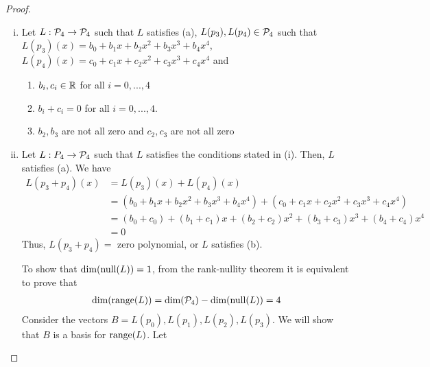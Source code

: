 \begin{proof}
    \renewcommand{\qedsymbol}{$\blacksquare$}
    \begin{enumerate}[(i)]
        \item Let $L:\P_4\rightarrow\P_4$ such that $L$ satisfies (a), $L(p_3), L(p_4)\in\P_4$ such that $L(p_3)(x)=b_0+b_1x+b_2x^2+b_3x^3+b_4x^4$, $L(p_4)(x)=c_0+c_1x+c_2x^2+c_3x^3+c_4x^4$ and
        \begin{enumerate}[(1)]
            \item $b_i,c_i\in\R$ for all $i=0,...,4$
            \item $b_i+c_i=0$ for all $i=0,...,4$.
            \item $b_2,b_3$ are not all zero and $c_2,c_3$ are not all zero
        \end{enumerate}
        \item Let $L:P_4\rightarrow\P_4$ such that $L$ satisfies the conditions stated in (i). Then, $L$ satisfies (a).
        We have 
        \[
            \begin{aligned}
                L(p_3+p_4)(x) &= L(p_3)(x)+L(p_4)(x)\\
                &= (b_0+b_1x+b_2x^2+b_3x^3+b_4x^4)+(c_0+c_1x+c_2x^2+c_3x^3+c_4x^4)\\
                &= (b_0+c_0)+(b_1+c_1)x+(b_2+c_2)x^2+(b_3+c_3)x^3+(b_4+c_4)x^4\\
                &= 0
            \end{aligned}
        \]
        Thus, $L(p_3+p_4)=$ zero polynomial, or $L$ satisfies (b).
        
        To show that $\dim(\nullla(L))=1$, from the rank-nullity theorem it is equivalent to prove that 
        \[
            \begin{aligned}
                \dim(\range(L))=\dim(\P_4)-\dim(\nullla(L))=4
            \end{aligned}
        \]
        Consider the vectors $B=L(p_0),L(p_1),L(p_2),L(p_3)$. We will show that $B$ is a basis for $\range(L)$.
        Let 
    \end{enumerate}
\end{proof}